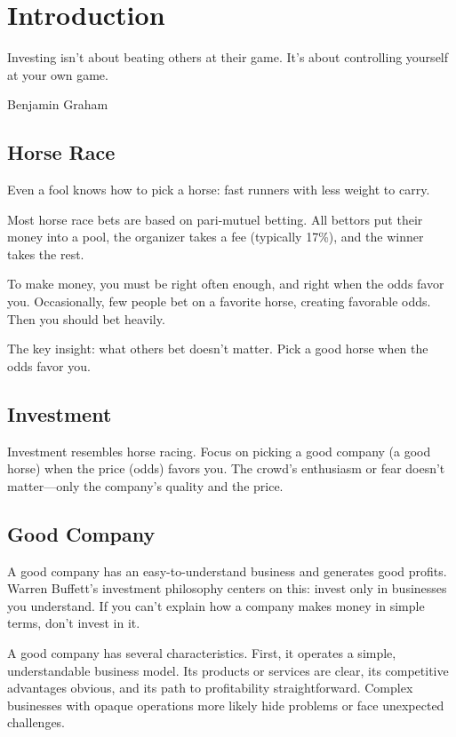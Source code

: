 \chapter*{Introduction}
\epigraph{Investing isn't about beating others at their game. It's about controlling yourself at your own game.}{Benjamin Graham}

\section*{Horse Race}

Even a fool knows how to pick a horse: fast runners with less weight to carry.

Most horse race bets are based on pari-mutuel betting. All bettors put their money into a pool, the organizer takes a fee (typically 17\%), and the winner takes the rest.

To make money, you must be right often enough, and right when the odds favor you. Occasionally, few people bet on a favorite horse, creating favorable odds. Then you should bet heavily.

The key insight: what others bet doesn't matter. Pick a good horse when the odds favor you.

\section*{Investment}

Investment resembles horse racing. Focus on picking a good company (a good horse) when the price (odds) favors you. The crowd's enthusiasm or fear doesn't matter—only the company's quality and the price. 

\section*{Good Company}

A good company has an easy-to-understand business and generates good profits. Warren Buffett's investment philosophy centers on this: invest only in businesses you understand. If you can't explain how a company makes money in simple terms, don't invest in it.

A good company has several characteristics. First, it operates a simple, understandable business model. Its products or services are clear, its competitive advantages obvious, and its path to profitability straightforward. Complex businesses with opaque operations more likely hide problems or face unexpected challenges.

